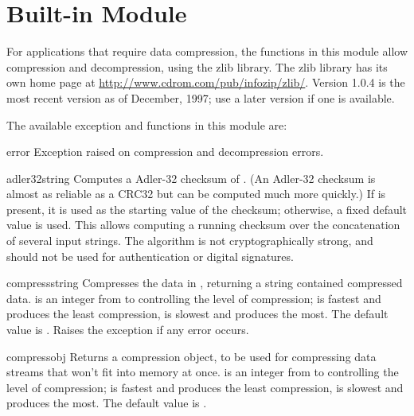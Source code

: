 
\section{Built-in Module }



For applications that require data compression, the functions in this
module allow compression and decompression, using the zlib library.
The zlib library has its own home page at
\url{http://www.cdrom.com/pub/infozip/zlib/}.  Version 1.0.4 is the
most recent version as of December, 1997; use a later version if one
is available.

The available exception and functions in this module are:

\begin{excdesc}{error}
  Exception raised on compression and decompression errors.
\end{excdesc}


\begin{funcdesc}{adler32}{string}
   Computes a Adler-32 checksum of .  (An Adler-32
   checksum is almost as reliable as a CRC32 but can be computed much
   more quickly.)  If  is present, it is used as the
   starting value of the checksum; otherwise, a fixed default value is
   used.  This allows computing a running checksum over the
   concatenation of several input strings.  The algorithm is not
   cryptographically strong, and should not be used for
   authentication or digital signatures.
\end{funcdesc}

\begin{funcdesc}{compress}{string}
  Compresses the data in , returning a string contained
  compressed data.   is an integer from  to
   controlling the level of compression;  is fastest
  and produces the least compression,  is slowest and produces
  the most.  The default value is .  Raises the
   exception if any error occurs.
\end{funcdesc}

\begin{funcdesc}{compressobj}{}
  Returns a compression object, to be used for compressing data streams
  that won't fit into memory at once.   is an integer from
   to  controlling the level of compression;  is
  fastest and produces the least compression,  is slowest and
  produces the most.  The default value is .
\end{funcdesc}

